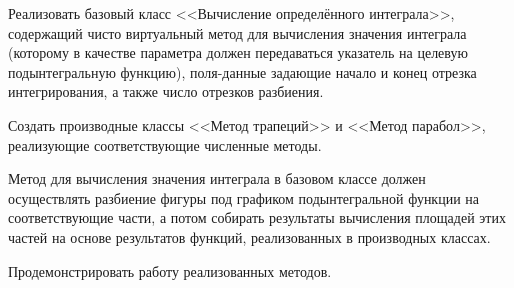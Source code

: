 Реализовать базовый класс <<Вычисление определённого
интеграла>>, содержащий чисто виртуальный метод для
вычисления значения интеграла (которому в качестве
		параметра должен передаваться указатель на целевую
		подынтегральную функцию), поля-данные задающие начало
и конец отрезка интегрирования, а также число отрезков
разбиения.

Создать производные классы <<Метод трапеций>> и
<<Метод парабол>>, реализующие соответствующие численные
методы.

Метод для вычисления значения интеграла в
базовом классе должен осуществлять разбиение фигуры под
графиком подынтегральной функции на соответствующие
части, а потом собирать результаты вычисления площадей
этих частей на основе результатов функций, реализованных
в производных классах.

Продемонстрировать работу
реализованных методов.

